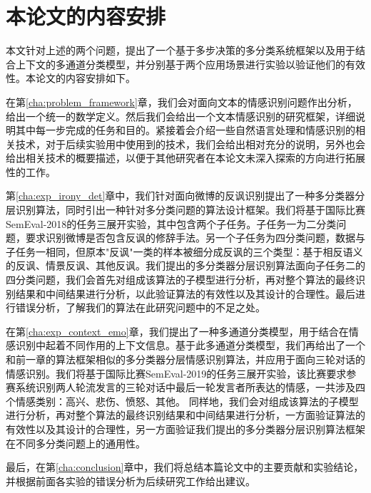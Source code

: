 \section{本论文的内容安排}

本文针对上述的两个问题，提出了一个基于多步决策的多分类系统框架以及用于结合上下文的多通道分类模型，并分别基于两个应用场景进行实验以验证他们的有效性。本论文的内容安排如下。

在第\ref{cha:problem_framework}章，我们会对面向文本的情感识别问题作出分析，给出一个统一的数学定义。然后我们会给出一个文本情感识别的研究框架，详细说明其中每一步完成的任务和目的。紧接着会介绍一些自然语言处理和情感识别的相关技术，对于后续实验用中使用到的技术，我们会给出相对充分的说明，另外也会给出相关技术的概要描述，以便于其他研究者在本论文未深入探索的方向进行拓展性的工作。

第\ref{cha:exp_irony_det}章中，我们针对面向微博的反讽识别提出了一种多分类器分层识别算法，同时引出一种针对多分类问题的算法设计框架。我们将基于国际比赛SemEval-2018的任务三\cite{van2018semeval}展开实验，其中包含两个子任务。子任务一为二分类问题，要求识别微博是否包含反讽的修辞手法。另一个子任务为四分类问题，数据与子任务一相同，但原本"反讽"一类的样本被细分成反讽的三个类型：基于相反语义的反讽、情景反讽、其他反讽。我们提出的多分类器分层识别算法面向子任务二的四分类问题，我们会首先对组成该算法的子模型进行分析，再对整个算法的最终识别结果和中间结果进行分析，以此验证算法的有效性以及其设计的合理性。最后进行错误分析，了解我们的算法在此研究问题中的不足之处。

在第\ref{cha:exp_context_emo}章，我们提出了一种多通道分类模型，用于结合在情感识别中起着不同作用的上下文信息。基于此多通道分类模型，我们再给出了一个和前一章的算法框架相似的多分类器分层情感识别算法，并应用于面向三轮对话的情感识别。我们将基于国际比赛SemEval-2019的任务三\cite{SemEval2019Task3}展开实验，该比赛要求参赛系统识别两人轮流发言的三轮对话中最后一轮发言者所表达的情感，一共涉及四个情感类别：高兴、悲伤、愤怒、其他。
同样地，我们会对组成该算法的子模型进行分析，再对整个算法的最终识别结果和中间结果进行分析，一方面验证算法的有效性以及其设计的合理性，另一方面验证我们提出的多分类器分层识别算法框架在不同多分类问题上的通用性。

最后，在第\ref{cha:conclusion}章中，我们将总结本篇论文中的主要贡献和实验结论，并根据前面各实验的错误分析为后续研究工作给出建议。












